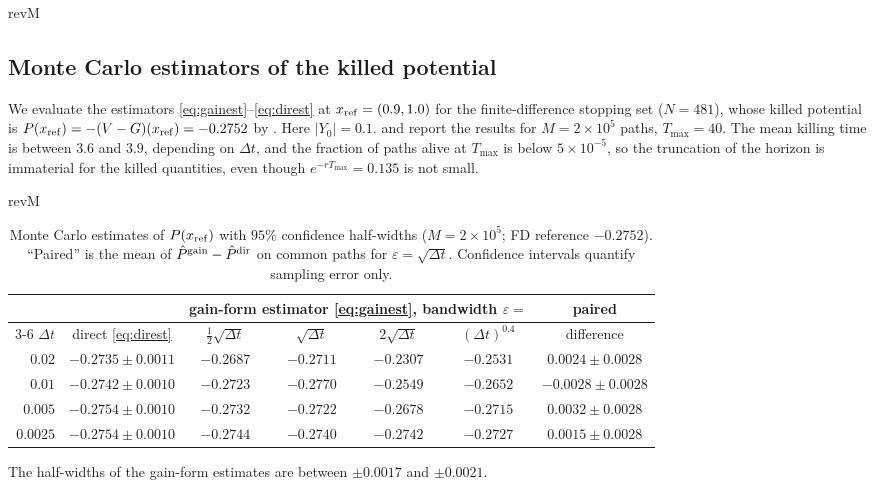 \begin{rv}{revM}{}
\subsection{Monte Carlo estimators of the killed potential}\label{sec:mcnum}

We evaluate the estimators \eqref{eq:gainest}--\eqref{eq:direst} at $x_{\rm ref}=(0.9,1.0)$ for the
finite-difference stopping set ($N=481$), whose killed potential is
$P(x_{\rm ref})=-(V-G)(x_{\rm ref})=-0.2752$ by . Here $|Y_0|=0.1$.
 and  report the results for $M=2\times10^5$ paths, $T_{\max}=40$. The
mean killing time is between $3.6$ and $3.9$, depending on $\Delta t$, and the fraction of paths alive at $T_{\max}$ is below
$5\times10^{-5}$, so the truncation of the horizon is immaterial for the killed quantities, even
though $e^{-rT_{\max}}=0.135$ is not small.

\begin{table}[htbp]
\begin{rv}{revM}{}
\centering\small
\caption{Monte Carlo estimates of $P(x_{\rm ref})$ with $95\%$ confidence half-widths
($M=2\times10^5$; FD reference $-0.2752$). ``Paired'' is the mean of
$\hat P^{\rm gain}-\hat P^{\rm dir}$ on common paths for $\varepsilon=\sqrt{\Delta t}$. Confidence
intervals quantify sampling error only.}\label{tab:mc}
\begin{tabular}{@{}rcccccc@{}}
\toprule
 & & \multicolumn{4}{c}{gain-form estimator \eqref{eq:gainest}, bandwidth $\varepsilon=$} & paired\\
\cmidrule(lr){3-6}
$\Delta t$ & direct \eqref{eq:direst} & $\tfrac12\sqrt{\Delta t}$ & $\sqrt{\Delta t}$ & $2\sqrt{\Delta t}$ & $(\Delta t)^{0.4}$ & difference\\
\midrule
$0.02$ & $-0.2735\pm0.0011$ & $-0.2687$ & $-0.2711$ & $-0.2307$ & $-0.2531$ & $0.0024\pm0.0028$\\
$0.01$ & $-0.2742\pm0.0010$ & $-0.2723$ & $-0.2770$ & $-0.2549$ & $-0.2652$ & $-0.0028\pm0.0028$\\
$0.005$ & $-0.2754\pm0.0010$ & $-0.2732$ & $-0.2722$ & $-0.2678$ & $-0.2715$ & $0.0032\pm0.0028$\\
$0.0025$ & $-0.2754\pm0.0010$ & $-0.2744$ & $-0.2740$ & $-0.2742$ & $-0.2727$ & $0.0015\pm0.0028$\\
\bottomrule
\end{tabular}

\smallskip
{\footnotesize The half-widths of the gain-form estimates are between $\pm0.0017$ and $\pm0.0021$.}
\end{rv}
\end{table}


\end{rv}
